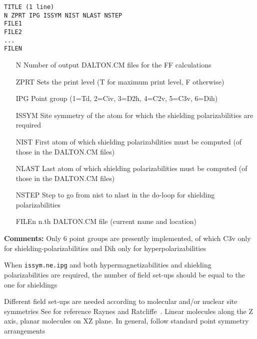 \begin{verbatim}
TITLE (1 line)
N ZPRT IPG ISSYM NIST NLAST NSTEP
FILE1
FILE2
... 
FILEN 
\end{verbatim}

\begin{itemize}
\item[N] Number of output DALTON.CM files for the FF calculations
\item[ZPRT]  Sets the print level (T for maximum print level, F otherwise)
\item[IPG] Point group (1=Td, 2=Civ, 3=D2h, 4=C2v, 5=C3v, 6=Dih)
\item[ISSYM] Site symmetry of the atom for which the shielding
polarizabilities are required
\item[NIST] First atom of which shielding polarizabilities must be computed
        (of those in  the DALTON.CM files)
\item[NLAST] Last atom of which shielding polarizabilities must be computed
        (of those in  the DALTON.CM files)
\item[NSTEP] Step to go from nist to nlast in the do-loop for
shielding polarizabilities
\item[FILEn] n.th DALTON.CM file (current name and location)
\end{itemize}


\smallskip
\noindent
{\bf Comments:} 
    Only 6 point groups are presently implemented, of which
    C3v only for shielding-polarizabilities and 
    Dih only for hyperpolarizabilities 

    When \verb|issym.ne.ipg| and both
    hypermagnetizabilities and shielding 
    polarizabilities are required, the number of field set-ups should 
    be equal to the one for shieldings

    Different field set-ups are needed according to
    molecular  and/or nuclear site symmetries
    See for reference Raynes and Ratcliffe~\cite{wtrrrmp37}.
    Linear molecules along the Z axis, planar molecules
    on XZ plane. In general, follow standard point
    symmetry arrangements

